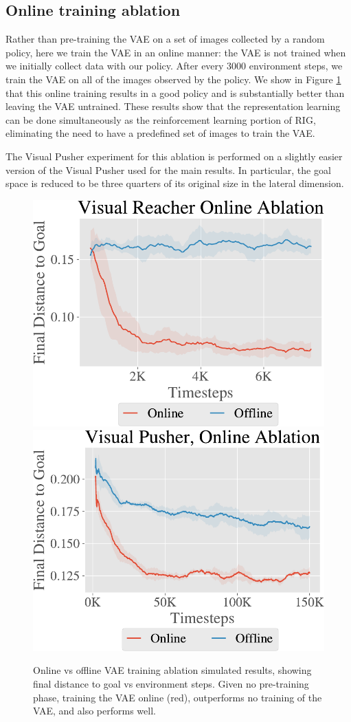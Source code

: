 \subsection{Online training ablation} \label{sec:appendix_online}
Rather than pre-training the VAE on a set of images collected by a random policy, here we train the VAE in an online manner: the VAE is not trained when we initially collect data with our policy.
After every 3000 environment steps, we train the VAE on all of the images observed by the policy.
We show in Figure \ref{fig:online-ablation-all-envs} that this online training results in a good policy and is substantially better than leaving the VAE untrained.
These results show that the representation learning can be done simultaneously as the reinforcement learning portion of RIG, eliminating the need to have a predefined set of images to train the VAE.

The Visual Pusher experiment for this ablation is performed on a slightly easier version of the Visual Pusher used for the main results.
In particular, the goal space is reduced to be three quarters of its original size in the lateral dimension.

\begin{figure}[h]
    \centering
    \includegraphics[height=0.3\linewidth]{rig/img/reacher_online_ablation.pdf}
    \hspace{15mm}
    \includegraphics[height=0.3\linewidth]{rig/img/pusher_online_ablation.pdf}
    \caption{Online vs offline VAE training ablation simulated results, showing final distance to goal vs environment steps. Given no pre-training phase, training the VAE online (red), outperforms no training of the VAE, and also performs well.}
    \label{fig:online-ablation-all-envs}
\end{figure}

